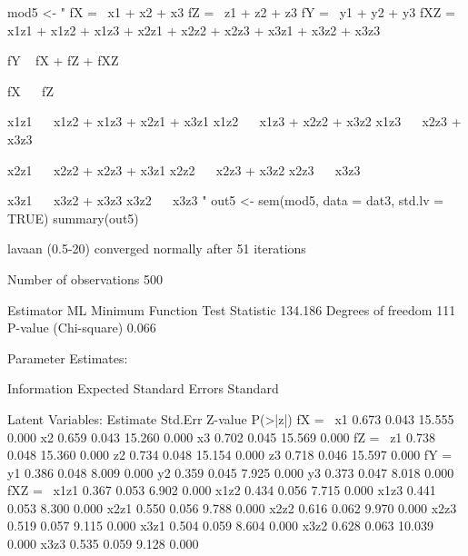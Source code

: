\begin{Schunk}
\begin{Sinput}
 mod5 <- "
 fX =~ x1 + x2 + x3
 fZ =~ z1 + z2 + z3
 fY =~ y1 + y2 + y3
 fXZ =~ x1z1 + x1z2 + x1z3 +
        x2z1 + x2z2 + x2z3 +
        x3z1 + x3z2 + x3z3
 
 fY ~ fX + fZ + fXZ
 
 fX ~~ fZ
 
 x1z1 ~~ x1z2 + x1z3 + x2z1 + x3z1
 x1z2 ~~ x1z3 + x2z2 + x3z2
 x1z3 ~~ x2z3 + x3z3
 
 x2z1 ~~ x2z2 + x2z3 + x3z1
 x2z2 ~~ x2z3 + x3z2
 x2z3 ~~ x3z3
 
 x3z1 ~~ x3z2 + x3z3
 x3z2 ~~ x3z3
 "
 out5 <- sem(mod5, data = dat3, std.lv = TRUE)
 summary(out5)
\end{Sinput}
\begin{Soutput}
lavaan (0.5-20) converged normally after  51 iterations

  Number of observations                           500

  Estimator                                         ML
  Minimum Function Test Statistic              134.186
  Degrees of freedom                               111
  P-value (Chi-square)                           0.066

Parameter Estimates:

  Information                                 Expected
  Standard Errors                             Standard

Latent Variables:
                   Estimate  Std.Err  Z-value  P(>|z|)
  fX =~                                               
    x1                0.673    0.043   15.555    0.000
    x2                0.659    0.043   15.260    0.000
    x3                0.702    0.045   15.569    0.000
  fZ =~                                               
    z1                0.738    0.048   15.360    0.000
    z2                0.734    0.048   15.154    0.000
    z3                0.718    0.046   15.597    0.000
  fY =~                                               
    y1                0.386    0.048    8.009    0.000
    y2                0.359    0.045    7.925    0.000
    y3                0.373    0.047    8.018    0.000
  fXZ =~                                              
    x1z1              0.367    0.053    6.902    0.000
    x1z2              0.434    0.056    7.715    0.000
    x1z3              0.441    0.053    8.300    0.000
    x2z1              0.550    0.056    9.788    0.000
    x2z2              0.616    0.062    9.970    0.000
    x2z3              0.519    0.057    9.115    0.000
    x3z1              0.504    0.059    8.604    0.000
    x3z2              0.628    0.063   10.039    0.000
    x3z3              0.535    0.059    9.128    0.000


\end{Soutput}
\end{Schunk}

